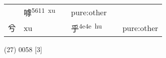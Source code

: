 \documentclass[14pt,a4paper]{scrartcl}
\begin{document}
\begin{longtable}[c]{@{}llllll@{}}
\begin{minipage}[t]{0.14\columnwidth}
\strut\end{minipage} &
\begin{minipage}[t]{0.14\columnwidth}\raggedright\strut
嘑\textsuperscript{5611~xu}
\strut\end{minipage} &
\begin{minipage}[t]{0.14\columnwidth}\raggedright\strut
\strut\end{minipage} &
\begin{minipage}[t]{0.14\columnwidth}\raggedright\strut
pure:other
\strut\end{minipage}\tabularnewline
\begin{minipage}[t]{0.14\columnwidth}\raggedright\strut
兮
\strut\end{minipage} &
\begin{minipage}[t]{0.14\columnwidth}\raggedright\strut
xu
\strut\end{minipage} &
\begin{minipage}[t]{0.14\columnwidth}\raggedright\strut
\strut\end{minipage} &
\begin{minipage}[t]{0.14\columnwidth}\raggedright\strut
乎\textsuperscript{4e4e~hu}
\strut\end{minipage} &
\begin{minipage}[t]{0.14\columnwidth}\raggedright\strut
\strut\end{minipage} &
\begin{minipage}[t]{0.14\columnwidth}\raggedright\strut
pure:other
\strut\end{minipage}\tabularnewline
\bottomrule
\end{longtable}

(27) 0058 {[}3{]}
\end{document}
